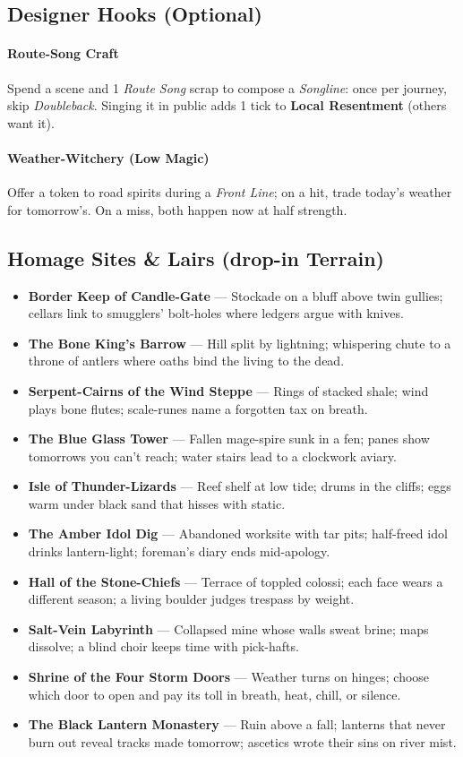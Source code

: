 \subsection*{Designer Hooks (Optional)}

\paragraph{Route-Song Craft}
Spend a scene and 1 \emph{Route Song} scrap to compose a \emph{Songline}: once per journey, skip \emph{Doubleback}. Singing it in public adds 1 tick to \textbf{Local Resentment} (others want it).

\paragraph{Weather-Witchery (Low Magic)}
Offer a token to road spirits during a \emph{Front Line}; on a hit, trade today’s weather for tomorrow’s. On a miss, both happen now at half strength.

\subsection*{Homage Sites \& Lairs (drop-in Terrain)}
\begin{itemize}
  \item \textbf{Border Keep of Candle-Gate} — Stockade on a bluff above twin gullies; cellars link to smugglers’ bolt-holes where ledgers argue with knives.
  \item \textbf{The Bone King’s Barrow} — Hill split by lightning; whispering chute to a throne of antlers where oaths bind the living to the dead.
  \item \textbf{Serpent-Cairns of the Wind Steppe} — Rings of stacked shale; wind plays bone flutes; scale-runes name a forgotten tax on breath.
  \item \textbf{The Blue Glass Tower} — Fallen mage-spire sunk in a fen; panes show tomorrows you can’t reach; water stairs lead to a clockwork aviary.
  \item \textbf{Isle of Thunder-Lizards} — Reef shelf at low tide; drums in the cliffs; eggs warm under black sand that hisses with static.
  \item \textbf{The Amber Idol Dig} — Abandoned worksite with tar pits; half-freed idol drinks lantern-light; foreman’s diary ends mid-apology.
  \item \textbf{Hall of the Stone-Chiefs} — Terrace of toppled colossi; each face wears a different season; a living boulder judges trespass by weight.
  \item \textbf{Salt-Vein Labyrinth} — Collapsed mine whose walls sweat brine; maps dissolve; a blind choir keeps time with pick-hafts.
  \item \textbf{Shrine of the Four Storm Doors} — Weather turns on hinges; choose which door to open and pay its toll in breath, heat, chill, or silence.
  \item \textbf{The Black Lantern Monastery} — Ruin above a fall; lanterns that never burn out reveal tracks made tomorrow; ascetics wrote their sins on river mist.
\end{itemize}

